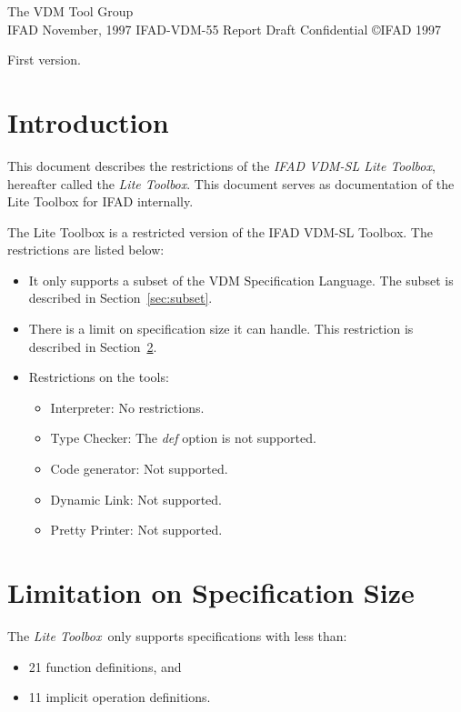 \documentclass[11pt]{article}
\begin{document}
         {The VDM Tool Group\\
          IFAD}
         {November, 1997}
         {IFAD-VDM-55}
         {Report}
         {Draft}
         {Confidential}
         {\copyright IFAD 1997}
         {\item[V1.0] First version.}

\tableofcontents
\newpage
{}
\parskip2mm


\newcommand{\lite}{{\em Lite Toolbox}}

\section{Introduction} \label{introduction}

This document describes the restrictions of the {\em IFAD VDM-SL Lite
  Toolbox}, hereafter called the {\em Lite Toolbox}. This document
serves as documentation of the Lite Toolbox for IFAD internally.


The Lite Toolbox is a restricted version of the IFAD VDM-SL Toolbox.
The restrictions are listed below:
\begin{itemize}
\item It only supports a subset of the VDM Specification Language. The
  subset is described in Section~\ref{sec:subset}.
\item There is a limit on specification size it can handle. This
  restriction is described in Section~\ref{sec:size}.
\item Restrictions on the tools:
  \begin{itemize}
    \item Interpreter: No restrictions.
    \item Type Checker: The {\em def} option is not supported.
    \item Code generator: Not supported.
    \item Dynamic Link: Not supported.
    \item Pretty Printer: Not supported.
  \end{itemize}
\end{itemize}

\section{Limitation on Specification Size}\label{sec:size}

The \lite\ only supports specifications with less than:
\begin{itemize}
\item 21 function definitions, and
\item 11 implicit operation definitions.
\end{itemize}
\end{document}
